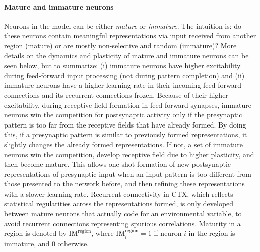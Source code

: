\documentclass{article}
\begin{document}
\paragraph{Mature and immature neurons} Neurons in the model can be either \textit{mature} or \textit{immature}. The intuition is: do these neurons contain meaningful representations via input received from another region (mature) or are mostly non-selective and random (immature)? More details on the dynamics and plasticity of mature and immature neurons can be seen below, but to summarize: (i) immature neurons have higher excitability during feed-forward input processing (not during pattern completion) and (ii) immature neurons have a higher learning rate in their incoming feed-forward connections and its recurrent connections frozen. Because of their higher excitability, during receptive field formation in feed-forward synapses, immature neurons win the competition for postsynaptic activity only if the presynaptic pattern is too far from the receptive fields that have already formed. By doing this, if a presynaptic pattern is similar to previously formed representations, it slightly changes the already formed representations. If not, a set of immature neurons win the competition, develop receptive field due to higher plasticity, and then become mature. This allows one-shot formation of new postsynaptic representations of presynaptic input when an input pattern is too different from those presented to the network before, and then refining these representations with a slower learning rate. Recurrent connectivity in CTX, which reflects statistical regularities across the representations formed, is only developed between mature neurons that actually code for an environmental variable, to avoid recurrent connections representing spurious correlations. Maturity in a region is denoted by $\textrm{IM}^\textrm{region}$, where $\textrm{IM}^\textrm{region}_i = 1$ if neuron $i$ in the region is immature, and 0 otherwise.
\end{document}
